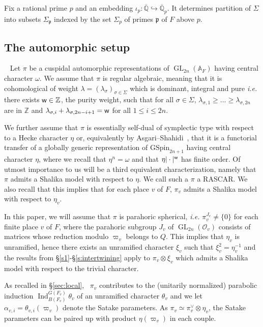 \documentclass{amsart}
\theoremstyle{definition}
\newcommand{\A}{\mathbb{A}}
\newcommand{\Q}{\mathbb{Q}}
\newcommand{\Z}{\mathbb{Z}}
\newcommand{\cO}{\mathcal{O}}
\newcommand{\Ind}{\operatorname{Ind}}
\newcommand{\GL}{\operatorname{GL}}
\newcommand{\sw}{{\sf{w}}}
\begin{document}
{Fix a rational prime $p$ and an embedding $\iota_p : \overline{\Q} \hookrightarrow \overline{\Q}_p$. It determines partition of $\Sigma$ into subsets 
$\Sigma_\mathfrak{p}$ indexed by the set  $\Sigma_p$ of primes $\mathfrak{p}$ of $F$ above $p$.  



\subsection{The automorphic setup}~\label{sec:setup} 
Let $\pi$ be a cuspidal automorphic representations of $\GL_{2n}(\A_F)$ having central character $\omega$.
We assume that $\pi$  is regular algebraic, meaning that it is cohomological of weight
$\lambda= (\lambda_{\sigma})_{\sigma \in \Sigma}$ which is dominant, integral and pure 
{\it i.e.} there exists $\sw  \in \Z$, the purity weight, such that  for all $\sigma \in \Sigma$,  $\lambda_{\sigma, 1}\geqslant  \dots \geqslant \lambda_{\sigma, 2n}$ are in $\Z$ and  $\lambda_{\sigma, i}+ \lambda_{\sigma, 2n- i+ 1}= \sw$   for all  $1 \leqslant  i \leqslant  2n$. 

We further assume that $\pi$ is essentially self-dual of symplectic type with respect to a Hecke character $\eta$ or, equivalently by Asgari--Shahidi~\cite{AS06}, that it is a functorial transfer of a globally generic representation of $\mathrm{GSpin}_{2n+1}$ having central character $\eta$, 
where we recall that $\eta^n=\omega$ and that $\eta |\cdot |^{\sw}$ has finite order. 
 Of utmost importance to us will be a third equivalent characterization, namely that $\pi$ admits a Shalika model with respect to $\eta$. 
 We call such a $\pi$ a RASCAR.  We also recall that this implies that for each place $v$ of $F$,  $\pi_v$ admits a Shalika model with respect to $\eta_v$. 

In this paper, we will assume that $\pi$ is parahoric spherical,  {\it i.e.}  $\pi_v^{J_v}\ne \{0\} $ for each finite place $v$ of $F$, where the parahoric subgroup $J_v$ of $\GL_{2n}(\cO_v)$ consists of matrices whose reduction modulo $\varpi_v$ belongs to $Q$. This implies that $\eta_v$ is unramified, hence there exists an unramified character $\xi_v$ such that $\xi_v^2=\eta_v^{-1}$ and the results from \S\ref{s1}-\S\ref{s:intertwining} apply to  $\pi_v\otimes \xi_v$  which admits  a Shalika model with respect to the trivial character.  

As recalled in \S\ref{sec:local}, ~$\pi_v$ contributes to the (unitarily normalized)  parabolic induction $\Ind_{B(F_v)}^{G(F_v)}\theta_v$ of an unramified character $\theta_v$ and we let $\alpha_{v,i}=\theta_{v,i}(\varpi_v)$ denote the Satake parameters. As $\pi_v\simeq\pi_v^\vee\otimes \eta_v$, the Satake parameters 
can be paired up with product $\eta(\varpi_v)$ in each couple.  

}
\end{document}
